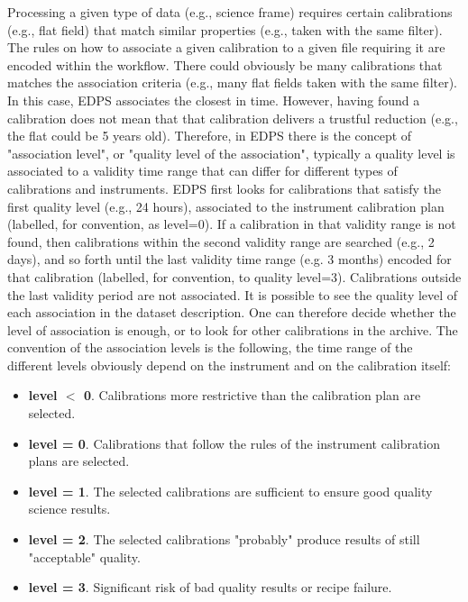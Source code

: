 Processing a given type of data (e.g., science frame) requires certain calibrations (e.g., flat field) that match
similar properties (e.g., taken with the same filter). The rules on how to associate a given calibration to a given file
requiring it are encoded
within the workflow. There could obviously be many calibrations that matches the association criteria (e.g., many flat
fields taken with the same filter). In this case,  
EDPS associates the closest in time. However, having found a calibration does not mean that that calibration delivers a
trustful reduction (e.g., the flat could be 5 years old).
Therefore, in EDPS there is the concept of "association level", or "quality level of the association", typically a
quality level is associated to a validity time range that
can differ for different types of calibrations and instruments. EDPS first looks for calibrations that satisfy the first
quality level (e.g., 24 hours), associated to the instrument calibration plan (labelled, for convention, as level=0).
If a calibration in that validity range is not found, then calibrations within the second validity range are searched (e.g., 2 days), and so forth until the last validity time range (e.g. 3 months)
encoded for that calibration (labelled, for convention, to quality level=3). Calibrations outside the last validity
period are not associated.
It is possible to see the quality level of each association in the dataset description. One can therefore decide whether
the level of association is enough, or to look for other calibrations in the archive.
The convention of the association levels is the following, the time range of the different levels obviously depend on
the instrument and on the calibration itself:

\begin{itemize}
\item {\bf level $<$ 0}. Calibrations more restrictive than the calibration plan are selected.
\item {\bf level = 0}. Calibrations that follow the rules of the instrument calibration plans are selected.
\item {\bf level = 1}. The selected calibrations are sufficient to ensure good quality science results.
\item {\bf level = 2}. The selected calibrations "probably" produce results of still "acceptable" quality.
\item {\bf level = 3}. Significant risk of bad quality results or recipe failure.

\end{itemize}